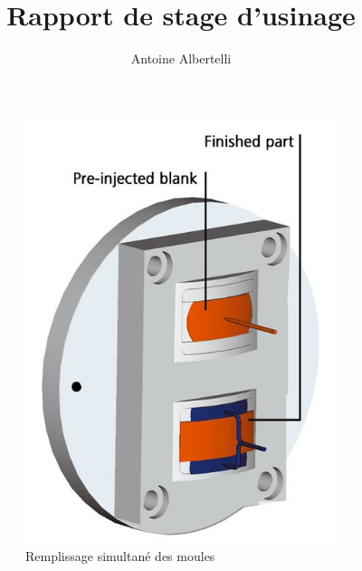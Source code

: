 \documentclass[a4paper]{report}
\author{Antoine Albertelli}
\title{Rapport de stage d'usinage}
\begin{document}

\tableofcontents

\begin{figure}
        \centering
        \begin{subfigure}[b]{0.4\textwidth}
                \includegraphics[width=\textwidth]{two-shots-a}
                \caption{Remplissage simultané des moules}
                \label{fig:gull}
        \end{subfigure}%
        ~ 
        \begin{subfigure}[b]{0.4\textwidth}

\end{subfigure}
\end{figure}
\end{document}
